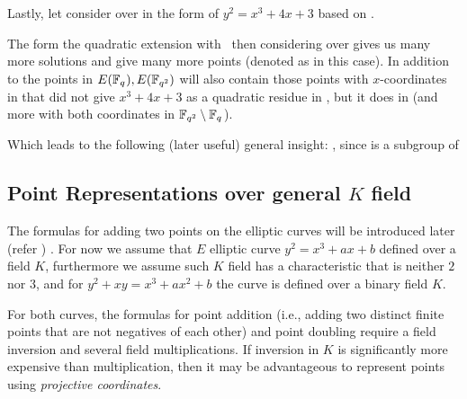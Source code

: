 \begin{example}
Lastly, let consider  over  in the form of $y^2 = x^3 + 4x +3$ based on \cite{theory.pairings.for.beginners}.

The form the quadratic extension  with \mathFormulaImaginaryTwoDCircleEquation ~then considering  over  gives us many more solutions and give many more points (denoted as  in this case). In addition to the points in $E(\mathbb{F}_{q^{}}), E(\mathbb{F}_{q^{2}})$ will also contain those points with $x$-coordinates in \mathFormulaFieldWithExtension{} that did not give  $x^3 + 4x+3$ 
as a quadratic residue in \mathFormulaFieldWithExtension{}, but it does in  (and more with both coordinates in $\mathbb{F}_{q^{2}} \setminus \mathbb{F}_{q^{}}$).

 Which leads to the following (later useful) general insight: , since \mathFormulaEllipticCurveOverField{\mathFormulaFieldWithExtension{}} is a subgroup of 
\label{example:finitefieldfover11}
\end{example}

\subsection{Point Representations over general $K$ field}
\label{ssec:ch1.EllipticCurvePointRepresentations}

The formulas for adding two points on the elliptic curves will be introduced later (refer ) . For now we assume that $E$ elliptic curve  $y^2 = x^3 + ax + b$ defined over a field $K$, furthermore we assume such $K$ field has a characteristic that is neither $2$ nor $3$, and for $y^2 + xy = x^3 + ax^2 + b$ the curve is defined over a binary field $K$.

For both curves, the formulas for point addition (i.e., adding two distinct finite points that
are not negatives of each other) and point doubling require a field inversion and several
field multiplications. If inversion in $K$ is significantly more expensive than multiplication,
then it may be advantageous to represent points using \textit{projective coordinates}.

